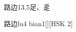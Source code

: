 \begin{entry}{路边}{13,5}{⾜、⾡}
  \begin{phonetics}{路边}{lu4 bian1}[][HSK 2]
  \end{phonetics}
\end{entry}

